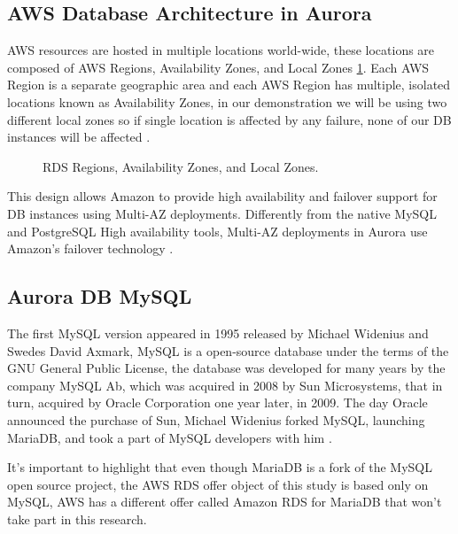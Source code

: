 \documentclass{article}
\begin{document}
\subsection{AWS Database Architecture in Aurora}

AWS resources are hosted in multiple locations world-wide, these locations are composed of AWS Regions, Availability Zones, and Local Zones \ref{fig:awszones}. Each AWS Region is a separate geographic area and each AWS Region has multiple, isolated locations known as Availability Zones, in our demonstration we will be using two different local zones so if single location is affected by any failure, none of our DB instances will be affected \cite{awszones}. 

\begin{figure}[hbt!]
\centering
\caption{\label{fig:awszones} RDS Regions, Availability Zones, and Local Zones.}
\end{figure}

This design allows Amazon to provide high availability and failover support for DB instances using Multi-AZ deployments. Differently from the native MySQL and PostgreSQL High availability tools, Multi-AZ deployments in Aurora use Amazon's failover technology \cite{awsha}.

\subsection{Aurora DB MySQL}
The first MySQL version appeared in 1995 released by Michael Widenius and Swedes David Axmark, MySQL is a open-source database under the terms of the GNU General Public License, the database was developed for many years by the company	MySQL Ab, which was acquired in 2008 by Sun	Microsystems, that in turn,	acquired by	Oracle	Corporation one year later,	in	2009. The day Oracle announced the purchase of Sun, Michael Widenius forked MySQL, launching MariaDB, and took a part of MySQL developers with him \cite{bartholomew2012mariadb}.

It's important to highlight that even though MariaDB is a fork of the MySQL open source project, the AWS RDS offer object of this study is based only on MySQL, AWS has a different offer called Amazon RDS for MariaDB that won't take part in this research. 
\end{document}
